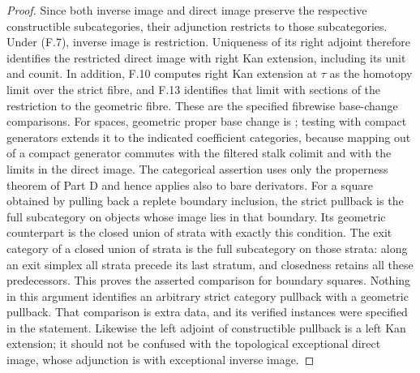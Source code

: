 \begin{proof}
Since both inverse image and direct image preserve the respective
constructible subcategories, their adjunction restricts to those
subcategories.  Under (F.7), inverse image is restriction.  Uniqueness
of its right adjoint therefore identifies the restricted direct image
with right Kan extension, including its unit and counit.  In addition,
F.10 computes right Kan extension at $\tau$ as the homotopy limit over
the strict fibre, and F.13 identifies that limit with sections of the
restriction to the geometric fibre.  These are the specified fibrewise
base-change comparisons.
For spaces, geometric proper base change is
\citet[Corollary 7.3.1.18]{FLurieHTT2009}; testing with compact generators
extends it to the indicated coefficient categories, because mapping
out of a compact generator commutes with the filtered stalk colimit
and with the limits in the direct image.  The categorical assertion
uses only the properness theorem of Part D and hence applies also to
bare derivators.  For a square obtained by pulling back a replete
boundary inclusion, the strict pullback is the full subcategory on
objects whose image lies in that boundary.  Its geometric counterpart
is the closed union of strata with exactly this condition.  The exit
category of a closed union of strata is the full subcategory on those
strata: along an exit simplex all strata precede its last stratum, and
closedness retains all these predecessors.  This proves the asserted
comparison for boundary squares.  Nothing in this argument identifies an arbitrary
strict category pullback with a geometric pullback.  That comparison
is extra data, and its verified instances were specified in the
statement.  Likewise the left adjoint of constructible pullback is a
left Kan extension; it should not be confused with the topological
exceptional direct image, whose adjunction is with exceptional
inverse image.
\end{proof}

